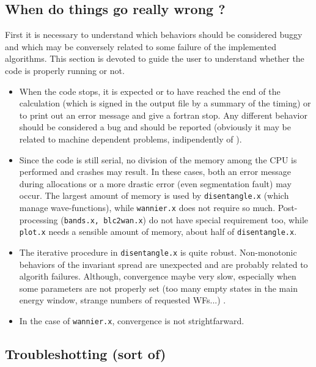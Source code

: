 \subsection{When do things go really wrong ?}
First it is necessary to understand which behaviors should be considered buggy and 
which may be conversely related to some failure of the implemented algorithms.
This section is devoted to guide the user to understand whether the code is
properly running or not. \\
%
%
\begin{itemize}
\item   When the code stops, it is expected or to have reached the end
        of the calculation (which is signed in the output file by a summary
        of the timing) or to print
        out an error message and give a fortran stop. Any different behavior
        should be considered a bug and should be reported 
        (obviously it may be related to machine dependent problems, 
        indipendently of \WANT).

\item   Since the code is still serial, no division of the memory among the
        CPU is performed and crashes may result. In these cases, both an
        error message during allocations or a more drastic error (even segmentation
        fault) may occur. The largest amount of memory is used by 
        {\tt disentangle.x} (which manage wave-functions), while {\tt wannier.x} 
        does not require so much. Post-processing ({\tt bands.x, blc2wan.x}) 
        do not have special requirement too, while {\tt plot.x} needs a sensible
        amount of memory, about half of {\tt disentangle.x}.
       
\item   The iterative procedure in {\tt disentangle.x} is quite robust. 
        Non-monotonic behaviors of the invariant spread are unexpected
        and are probably related to algorith failures. Although, convergence
        maybe very slow, especially when some parameters are not properly set
        (too many empty states in the main energy window, strange numbers of 
        requested WFs...) .

\item   In the case of {\tt wannier.x}, convergence is not strightfarward.

\end{itemize}


\subsection{Troubleshotting (sort of)}


